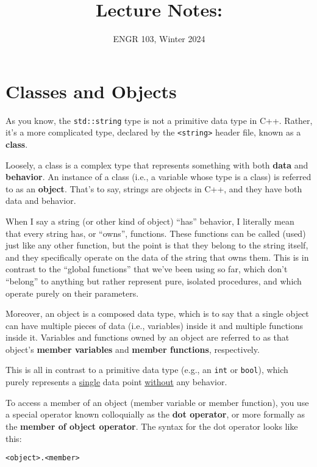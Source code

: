 \documentclass{article}
\title{
    Lecture Notes: \lecturetitle
}
\author{ENGR 103, Winter 2024}
\date{}
\begin{document}
\maketitle

\section{Classes and Objects}

As you know, the \texttt{std::string} type is not a primitive data type in C++. Rather, it's a more complicated type, declared by the \texttt{<string>} header file, known as a \textbf{class}.

Loosely, a class is a complex type that represents something with both \textbf{data} and \textbf{behavior}. An instance of a class (i.e., a variable whose type is a class) is referred to as an \textbf{object}. That's to say, strings are objects in C++, and they have both data and behavior.

When I say a string (or other kind of object) ``has'' behavior, I literally mean that every string has, or ``owns'', functions. These functions can be called (used) just like any other function, but the point is that they belong to the string itself, and they specifically operate on the data of the string that owns them. This is in contrast to the ``global functions'' that we've been using so far, which don't ``belong'' to anything but rather represent pure, isolated procedures, and which operate purely on their parameters.

Moreover, an object is a composed data type, which is to say that a single object can have multiple pieces of data (i.e., variables) inside it and multiple functions inside it. Variables and functions owned by an object are referred to as that object's \textbf{member variables} and \textbf{member functions}, respectively.

This is all in contrast to a primitive data type (e.g., an \texttt{int} or \texttt{bool}), which purely represents a \ul{single} data point \ul{without} any behavior.

To access a member of an object (member variable or member function), you use a special operator known colloquially as the \textbf{dot operator}, or more formally as the \textbf{member of object operator}. The syntax for the dot operator looks like this:

\begin{verbatim}
<object>.<member>
\end{verbatim}
\end{document}
